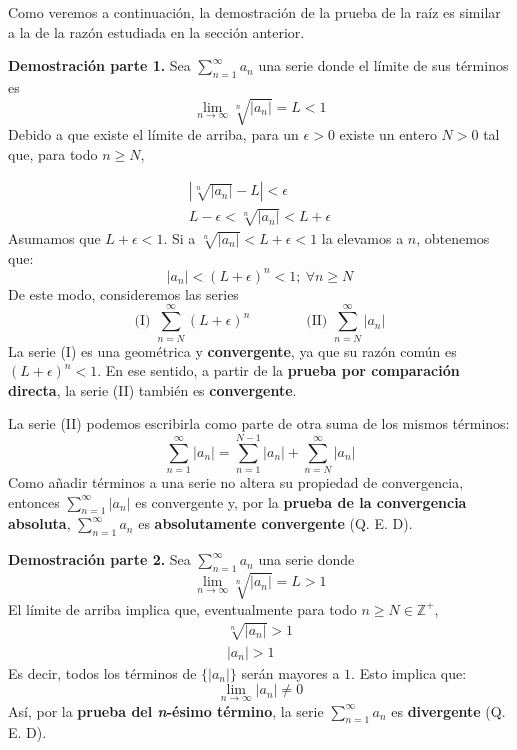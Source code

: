 \documentclass[12pt]{article}
\begin{document}
Como veremos a continuación, la demostración de la prueba de la raíz es similar a la de la razón estudiada en la sección anterior.

\textbf{Demostración parte 1.} Sea $\sum_{n = 1}^{\infty} a_{n}$ una serie donde el límite de sus términos es
\[
  \lim_{n \to \infty} \sqrt[n]{|a_{n}|} = L < 1
\]
Debido a que existe el límite de arriba, para un $\epsilon > 0$ existe un entero $N > 0$ tal que, para todo $n \geq N$,

\begin{gather*}
  |\sqrt[n]{|a_{n}|} - L| < \epsilon \\
  L - \epsilon < \sqrt[n]{|a_{n}|} < L + \epsilon
\end{gather*}
Asumamos que $L + \epsilon < 1$. Si a $\sqrt[n]{|a_{n}|} < L + \epsilon < 1$ la elevamos a $n$, obtenemos que:
\[
  |a_{n}| < (L + \epsilon)^{n} < 1; \ \forall n \geq N
\]
De este modo, consideremos las series
\[
  \text{(I) } \sum_{n = N}^{\infty} (L + \epsilon)^{n} \qquad \qquad
  \text{(II) } \sum_{n = N}^{\infty} |a_{n}|
\]
La serie (I) es una geométrica y \textbf{convergente}, ya que su razón común es $(L + \epsilon)^{n} < 1$. En ese sentido, a partir de la \textbf{prueba por comparación directa}, la serie (II) también es \textbf{convergente}.

La serie (II) podemos escribirla como parte de otra suma de los mismos términos:
\[
  \sum_{n = 1}^{\infty} |a_{n}| = \sum_{n = 1}^{N - 1} |a_{n}| + \sum_{n = N}^{\infty} |a_{n}|
\]
Como añadir términos a una serie no altera su propiedad de convergencia, entonces $\sum_{n = 1}^{\infty} |a_{n}|$ es convergente y, por la \textbf{prueba de la convergencia absoluta}, $\sum_{n = 1}^{\infty} a_{n}$ es \textbf{absolutamente convergente} (Q. E. D).

\textbf{Demostración parte 2.} Sea $\sum_{n = 1}^{\infty} a_{n}$ una serie donde
\[
  \lim_{n \to \infty} \sqrt[n]{|a_{n}|} = L > 1
\]
El límite de arriba implica que, eventualmente para todo $n \geq N \in \mathbb{Z}^{+}$,
\begin{align*}
  \sqrt[n]{|a_{n}|} > 1 \\
  |a_{n}| > 1
\end{align*}
Es decir, todos los términos de $\{|a_{n}|\}$ serán mayores a $1$. Esto implica que:
\[
  \lim_{n \to \infty} |a_{n}| \neq 0
\]
Así, por la \textbf{prueba del \textit{n}-ésimo término}, la serie $\sum_{n = 1}^{\infty} a_{n}$ es \textbf{divergente} (Q. E. D).
\end{document}
